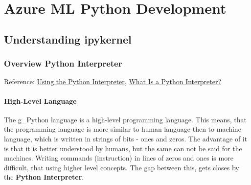 \section{Azure ML Python Development}\label{sec:PythonDevEnv}
\subsection{Understanding ipykernel}
\subsubsection{Overview Python Interpreter}
Reference: \href{https://docs.python.org/3/tutorial/interpreter.html#the-interpreter-and-its-environment}{Using the Python Interpreter}, \href{https://blog.hubspot.com/website/what-is-python-interpreter#:~:text=A%20python%20interpreter%20is%20a,and%20low%2Dlevel%20languages%20are.}{What Is a Python Interpreter?}\\


\paragraph{High-Level Language}
The \gls{g_Python} language is a high-level programming language. This means, that the programming language is more similar to human language then to machine language, which is written in strings of bits - ones and zeros.
The advantage of it is that it is better understood by humans, but the same can not be said for the machines. Writing commands (instruction) in lines of zeros and ones is more difficult, that using higher level concepts. The gap between this, gets closes by the \textbf{Python Interpreter}.\\

